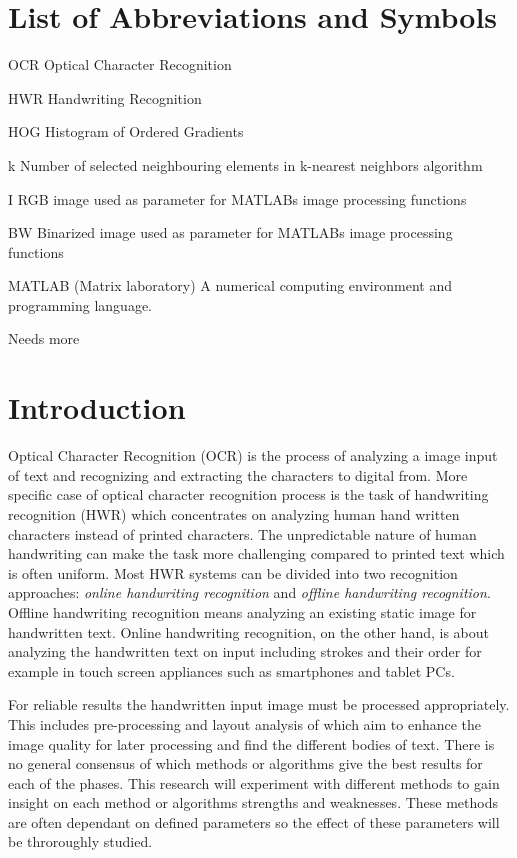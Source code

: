 \documentclass{article}
\begin{document}
   \newpage
   \section*{List of Abbreviations and Symbols}

   \begin{abbrv}
    \item[OCR] Optical Character Recognition
    \item[HWR] Handwriting Recognition
    \item[HOG] Histogram of Ordered Gradients
    \item[k] Number of selected neighbouring elements in k-nearest neighbors algorithm
    \item[I] RGB image used as parameter for MATLABs image processing functions
    \item[BW] Binarized image used as parameter for MATLABs image processing functions
    \item[MATLAB] (Matrix laboratory) A numerical computing environment and programming language.

    {\color{red}Needs more }
   \end{abbrv}

   \newpage
   \section{Introduction}
    Optical Character Recognition (OCR) is the process of analyzing a image input of  text and recognizing and extracting the characters to digital from. More specific case of optical character recognition process is the task of handwriting recognition (HWR) which concentrates on analyzing human hand written characters instead of printed characters. The unpredictable nature of human handwriting can make the task more challenging compared to printed text which is often uniform. Most HWR systems can be divided into two recognition approaches: \textit{online handwriting recognition} and \textit{offline handwriting recognition}. Offline handwriting recognition means analyzing an existing static image for handwritten text. Online handwriting recognition, on the other hand, is about analyzing the handwritten text on input including strokes and their order for example in touch screen appliances such as smartphones and tablet PCs.

    For reliable results the handwritten input image must be processed appropriately. This includes pre-processing and layout analysis of which aim to enhance the image quality for later processing and find the different bodies of text. There is no general consensus of which methods or algorithms give the best results for each of the phases. This research will experiment with different methods to gain insight on each method or algorithms strengths and weaknesses. These methods are often dependant on defined parameters so the effect of these parameters will be throroughly studied.
\end{document}
